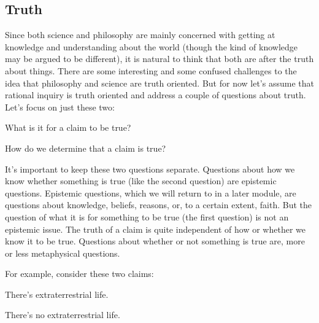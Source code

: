 \subsection{Truth}
\label{s:p1.1.1}
Since both science and philosophy are mainly concerned with getting at knowledge and understanding about the world (though the kind of knowledge may be argued to be different), it is natural to think that both are after the truth about things. There are some interesting and some confused challenges to the idea that philosophy and science are truth oriented. But for now let’s assume that rational inquiry is truth oriented and address a couple of questions about truth. Let’s focus on just these two:
\begin{earg}
    \item[\ex{truth1}] What is it for a claim to be true?
    \item[\ex{truth2}] How do we determine that a claim is true?
\end{earg}
It’s important to keep these two questions separate. Questions about how we know whether something is true (like the second question) are epistemic questions. Epistemic questions, which we will return to in a later module, are questions about knowledge, beliefs, reasons, or, to a certain extent, faith. But the question of what it is for something to be true (the first question) is not an epistemic issue. The truth of a claim is quite independent of how or whether we know it to be true. Questions about whether or not something is true are, more or less metaphysical questions.

For example, consider these two claims:

\begin{earg}
    \item[] There's extraterrestrial life.
    \item[] There's no extraterrestrial life. 
\end{earg}


